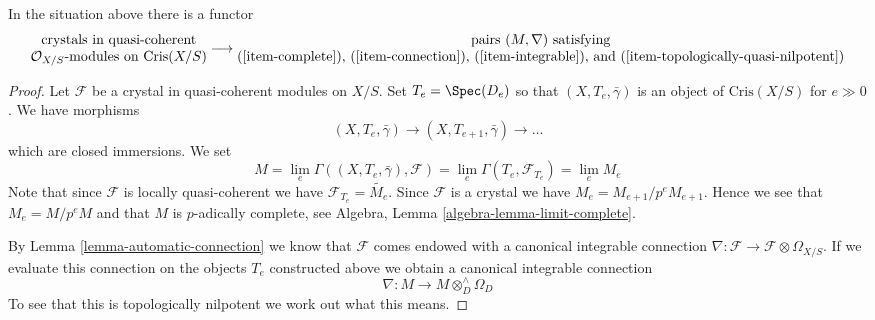 \begin{lemma}
\label{lemma-crystals-on-affine}
In the situation above there is a functor
$$
\begin{matrix}
\text{crystals in quasi-coherent} \\
\mathcal{O}_{X/S}\text{-modules on }\text{Cris}(X/S)
\end{matrix}
\longrightarrow
\begin{matrix}
\text{pairs }(M, \nabla)\text{ satisfying} \\
\text{(\ref{item-complete}), (\ref{item-connection}),
(\ref{item-integrable}), and (\ref{item-topologically-quasi-nilpotent})}
\end{matrix}
$$
\end{lemma}

\begin{proof}
Let $\mathcal{F}$ be a crystal in quasi-coherent modules on $X/S$.
Set $T_e = \Spec(D_e)$ so that $(X, T_e, \bar\gamma)$ is an object
of $\text{Cris}(X/S)$ for $e \gg 0$. We have morphisms
$$
(X, T_e, \bar\gamma) \to (X, T_{e + 1}, \bar\gamma) \to \ldots
$$
which are closed immersions. We set
$$
M =
\lim_e \Gamma((X, T_e, \bar\gamma), \mathcal{F}) =
\lim_e \Gamma(T_e, \mathcal{F}_{T_e}) = \lim_e M_e
$$
Note that since $\mathcal{F}$ is locally quasi-coherent we have
$\mathcal{F}_{T_e} = \widetilde{M_e}$. Since $\mathcal{F}$ is a
crystal we have $M_e = M_{e + 1}/p^eM_{e + 1}$. Hence we see that
$M_e = M/p^eM$ and that $M$ is $p$-adically complete, see
Algebra, Lemma \ref{algebra-lemma-limit-complete}.

\medskip\noindent
By Lemma \ref{lemma-automatic-connection} we know that $\mathcal{F}$
comes endowed with a canonical integrable connection
$\nabla : \mathcal{F} \to \mathcal{F} \otimes \Omega_{X/S}$.
If we evaluate this connection on the objects $T_e$ constructed above
we obtain a canonical integrable connection
$$
\nabla : M \longrightarrow M \otimes^\wedge_D \Omega_D
$$
To see that this is topologically nilpotent we work out what this means.


\end{proof}

